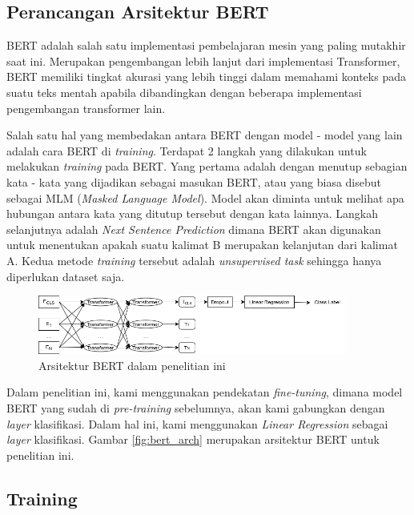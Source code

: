 \subsection{Perancangan Arsitektur BERT}
BERT adalah salah satu implementasi pembelajaran mesin yang paling mutakhir saat ini. Merupakan pengembangan lebih lanjut dari implementasi Transformer, BERT memiliki tingkat akurasi yang lebih tinggi dalam memahami konteks pada suatu teks mentah apabila dibandingkan dengan beberapa implementasi pengembangan transformer lain.

Salah satu hal yang membedakan antara BERT dengan model - model yang lain adalah cara BERT di \textit{training}. Terdapat 2 langkah yang dilakukan untuk melakukan \textit{training} pada BERT. Yang pertama adalah dengan menutup sebagian kata - kata yang dijadikan sebagai masukan BERT, atau yang biasa disebut sebagai MLM (\textit{Masked Language Model}). Model akan diminta untuk melihat apa hubungan antara kata yang ditutup tersebut dengan kata lainnya. Langkah selanjutnya adalah \textit{Next Sentence Prediction} dimana BERT akan digunakan untuk menentukan apakah suatu kalimat B merupakan kelanjutan dari kalimat A. Kedua metode \textit{training} tersebut adalah \textit{unsupervised task} sehingga hanya diperlukan dataset saja.

\begin{figure}[h!]
    \begin{center}
        \includegraphics[width= 0.9\textwidth]{gambar/bert_arch.png}
        \caption{Arsitektur BERT dalam penelitian ini}
        \label{fig: bert_arch}
    \end{center}
\end{figure}


Dalam penelitian ini, kami menggunakan pendekatan \textit{fine-tuning}, dimana model BERT yang sudah di \textit{pre-training} sebelumnya, akan kami gabungkan dengan \textit{layer} klasifikasi. Dalam hal ini, kami menggunakan \textit{Linear Regression} sebagai \textit{layer} klasifikasi. Gambar \ref{fig:bert_arch} merupakan arsitektur BERT untuk penelitian ini.

\subsection{Training}

